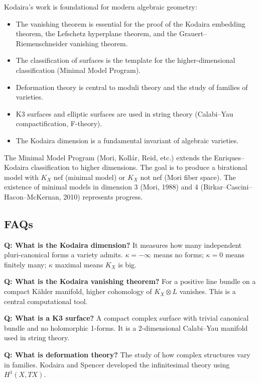Kodaira's work is foundational for modern algebraic geometry:
\begin{itemize}
    \item The vanishing theorem is essential for the proof of the Kodaira embedding theorem, the Lefschetz hyperplane theorem, and the Grauert--Riemenschneider vanishing theorem.
    \item The classification of surfaces is the template for the higher-dimensional classification (Minimal Model Program).
    \item Deformation theory is central to moduli theory and the study of families of varieties.
    \item K3 surfaces and elliptic surfaces are used in string theory (Calabi--Yau compactification, F-theory).
    \item The Kodaira dimension is a fundamental invariant of algebraic varieties.
\end{itemize}

The Minimal Model Program (Mori, Koll\'{a}r, Reid, etc.) extends the Enriques--Kodaira classification to higher dimensions. The goal is to produce a birational model with $K_X$ nef (minimal model) or $K_X$ not nef (Mori fiber space). The existence of minimal models in dimension 3 (Mori, 1988) and 4 (Birkar--Cascini--Hacon--McKernan, 2010) represents progress.

\subsection*{FAQs}

\noindent\textbf{Q: What is the Kodaira dimension?} It measures how many independent pluri-canonical forms a variety admits. $\kappa = -\infty$ means no forms; $\kappa = 0$ means finitely many; $\kappa$ maximal means $K_X$ is big.

\noindent\textbf{Q: What is the Kodaira vanishing theorem?} For a positive line bundle on a compact K\"{a}hler manifold, higher cohomology of $K_X \otimes L$ vanishes. This is a central computational tool.

\noindent\textbf{Q: What is a K3 surface?} A compact complex surface with trivial canonical bundle and no holomorphic 1-forms. It is a 2-dimensional Calabi--Yau manifold used in string theory.

\noindent\textbf{Q: What is deformation theory?} The study of how complex structures vary in families. Kodaira and Spencer developed the infinitesimal theory using $H^1(X, TX)$.

